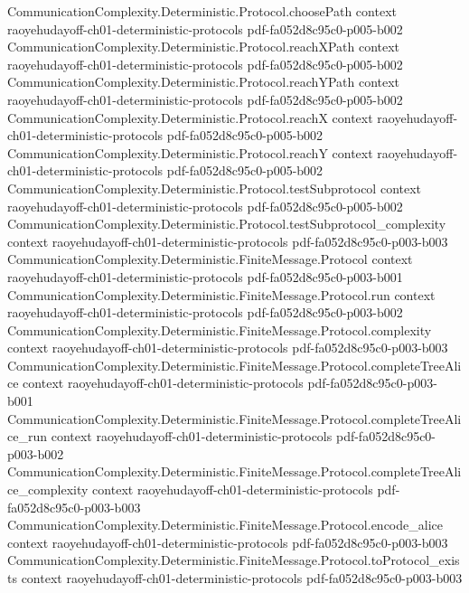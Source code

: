 \begin{lemma}
\proofstep
  {CommunicationComplexity.Deterministic.Protocol.choosePath}
  {context}
  {raoyehudayoff-ch01-deterministic-protocols}
  {pdf-fa052d8c95c0-p005-b002}
\proofstep
  {CommunicationComplexity.Deterministic.Protocol.reachXPath}
  {context}
  {raoyehudayoff-ch01-deterministic-protocols}
  {pdf-fa052d8c95c0-p005-b002}
\proofstep
  {CommunicationComplexity.Deterministic.Protocol.reachYPath}
  {context}
  {raoyehudayoff-ch01-deterministic-protocols}
  {pdf-fa052d8c95c0-p005-b002}
\proofstep
  {CommunicationComplexity.Deterministic.Protocol.reachX}
  {context}
  {raoyehudayoff-ch01-deterministic-protocols}
  {pdf-fa052d8c95c0-p005-b002}
\proofstep
  {CommunicationComplexity.Deterministic.Protocol.reachY}
  {context}
  {raoyehudayoff-ch01-deterministic-protocols}
  {pdf-fa052d8c95c0-p005-b002}
\proofstep
  {CommunicationComplexity.Deterministic.Protocol.testSubprotocol}
  {context}
  {raoyehudayoff-ch01-deterministic-protocols}
  {pdf-fa052d8c95c0-p005-b002}
\proofstep
  {CommunicationComplexity.Deterministic.Protocol.testSubprotocol_complexity}
  {context}
  {raoyehudayoff-ch01-deterministic-protocols}
  {pdf-fa052d8c95c0-p003-b003}
\proofstep
  {CommunicationComplexity.Deterministic.FiniteMessage.Protocol}
  {context}
  {raoyehudayoff-ch01-deterministic-protocols}
  {pdf-fa052d8c95c0-p003-b001}
\proofstep
  {CommunicationComplexity.Deterministic.FiniteMessage.Protocol.run}
  {context}
  {raoyehudayoff-ch01-deterministic-protocols}
  {pdf-fa052d8c95c0-p003-b002}
\proofstep
  {CommunicationComplexity.Deterministic.FiniteMessage.Protocol.complexity}
  {context}
  {raoyehudayoff-ch01-deterministic-protocols}
  {pdf-fa052d8c95c0-p003-b003}
\proofstep
  {CommunicationComplexity.Deterministic.FiniteMessage.Protocol.completeTreeAlice}
  {context}
  {raoyehudayoff-ch01-deterministic-protocols}
  {pdf-fa052d8c95c0-p003-b001}
\proofstep
  {CommunicationComplexity.Deterministic.FiniteMessage.Protocol.completeTreeAlice_run}
  {context}
  {raoyehudayoff-ch01-deterministic-protocols}
  {pdf-fa052d8c95c0-p003-b002}
\proofstep
  {CommunicationComplexity.Deterministic.FiniteMessage.Protocol.completeTreeAlice_complexity}
  {context}
  {raoyehudayoff-ch01-deterministic-protocols}
  {pdf-fa052d8c95c0-p003-b003}
\proofstep
  {CommunicationComplexity.Deterministic.FiniteMessage.Protocol.encode_alice}
  {context}
  {raoyehudayoff-ch01-deterministic-protocols}
  {pdf-fa052d8c95c0-p003-b003}
\proofstep
  {CommunicationComplexity.Deterministic.FiniteMessage.Protocol.toProtocol_exists}
  {context}
  {raoyehudayoff-ch01-deterministic-protocols}
  {pdf-fa052d8c95c0-p003-b003}
\proofstep

\end{lemma}
